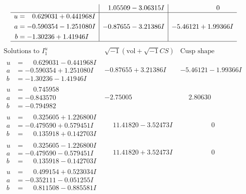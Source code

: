 \documentclass[1p]{elsarticle_modified}
\theoremstyle{definition}
\newcommand{\I}{\sqrt{-1}}
\begin{document}
$$\begin{array}{c|c|c}
 & \phantom{-}1.05509 - 3.06315 I & \phantom{-0.000000 } 0 \\ \hline\begin{aligned}
u &= \phantom{-}0.629031 + 0.441968 I \\
a &= -0.590354 - 1.251080 I \\
b &= -1.30236 + 1.41946 I\end{aligned}
 & -0.87655 - 3.21386 I & -5.46121 + 1.99366 I\\
 \hline 
 \end{array}$$\newpage$$\begin{array}{c|c|c}  
\text{Solutions to }I^u_{1}& \I (\text{vol} + \sqrt{-1}CS) & \text{Cusp shape}\\
 \hline 
\begin{aligned}
u &= \phantom{-}0.629031 - 0.441968 I \\
a &= -0.590354 + 1.251080 I \\
b &= -1.30236 - 1.41946 I\end{aligned}
 & -0.87655 + 3.21386 I & -5.46121 - 1.99366 I \\ \hline\begin{aligned}
u &= \phantom{-}0.745958\phantom{ +0.000000I} \\
a &= -0.843570\phantom{ +0.000000I} \\
b &= -0.794982\phantom{ +0.000000I}\end{aligned}
 & -2.75005\phantom{ +0.000000I} & \phantom{-}2.80630\phantom{ +0.000000I} \\ \hline\begin{aligned}
u &= \phantom{-}0.325605 + 1.226800 I \\
a &= -0.479590 + 0.579451 I \\
b &= \phantom{-}0.135918 + 0.142703 I\end{aligned}
 & \phantom{-}11.41820 - 3.52473 I & \phantom{-0.000000 } 0 \\ \hline\begin{aligned}
u &= \phantom{-}0.325605 - 1.226800 I \\
a &= -0.479590 - 0.579451 I \\
b &= \phantom{-}0.135918 - 0.142703 I\end{aligned}
 & \phantom{-}11.41820 + 3.52473 I & \phantom{-0.000000 } 0 \\ \hline\begin{aligned}
u &= \phantom{-}0.499154 + 0.523034 I \\
a &= -0.352111 - 0.051255 I \\
b &= \phantom{-}0.811508 - 0.885581 I\end{aligned}

\end{array}$$
\end{document}
